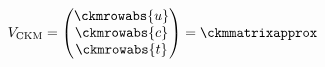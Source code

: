 \begin{equation}
V_{\text{CKM}} = \begin{pmatrix}
  \ckmrowabs{u} \\ \ckmrowabs{c} \\ \ckmrowabs{t}
\end{pmatrix} = \ckmmatrixapprox
\end{equation}
